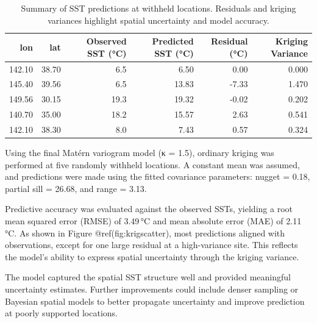 \documentclass[
  11pt,
]{article}
\begin{document}
\begin{table}

\caption{Summary of SST predictions at withheld locations. Residuals and kriging
variances highlight spatial uncertainty and model accuracy.}
\centering
\begin{tabular}[t]{rrrrrr}
\toprule
lon & lat & Observed SST (°C) & Predicted SST (°C) & Residual (°C) & Kriging Variance\\
\midrule
142.10 & 38.70 & 6.5 & 6.50 & 0.00 & 0.000\\
145.40 & 39.56 & 6.5 & 13.83 & -7.33 & 1.470\\
149.56 & 30.15 & 19.3 & 19.32 & -0.02 & 0.202\\
140.70 & 35.00 & 18.2 & 15.57 & 2.63 & 0.541\\
142.10 & 38.30 & 8.0 & 7.43 & 0.57 & 0.324\\
\bottomrule
\end{tabular}
\end{table}

Using the final Matérn variogram model (κ = 1.5), ordinary kriging was
performed at five randomly withheld locations. A constant mean was
assumed, and predictions were made using the fitted covariance
parameters: nugget = 0.18, partial sill = 26.68, and range = 3.13.

Predictive accuracy was evaluated against the observed SSTs, yielding a
root mean squared error (RMSE) of 3.49\,°C and mean absolute error (MAE)
of 2.11\,°C. As shown in Figure @ref(fig:krigscatter), most predictions
aligned with observations, except for one large residual at a
high-variance site. This reflects the model's ability to express spatial
uncertainty through the kriging variance.

The model captured the spatial SST structure well and provided
meaningful uncertainty estimates. Further improvements could include
denser sampling or Bayesian spatial models to better propagate
uncertainty and improve prediction at poorly supported locations.
\end{document}
